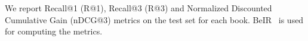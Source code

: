 We report Recall@1 (R@1), Recall@3 (R@3) and Normalized Discounted Cumulative Gain (nDCG@3) metrics on the test set for each book. BeIR~\cite{thakur2021beir} is used for computing the metrics.



